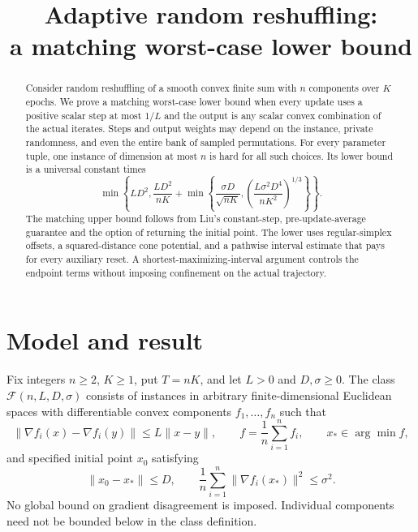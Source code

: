 \documentclass[11pt]{article}
\title{Adaptive random reshuffling:\\a matching worst-case lower bound}
\author{}
\date{}
\theoremstyle{remark}
\newcommand{\norm}[1]{\lVert #1\rVert}
\newcommand{\Class}{\mathcal F}
\begin{document}
\maketitle

\begin{abstract}
Consider random reshuffling of a smooth convex finite sum with $n$
components over $K$ epochs. We prove a matching worst-case lower bound
when every update uses a positive scalar step at most $1/L$ and the
output is any scalar convex combination of the actual iterates. Steps
and output weights may depend on the instance, private randomness, and
even the entire bank of sampled permutations. For every parameter tuple,
one instance of dimension at most $n$ is hard for all such choices.
Its lower bound is a universal constant times
\[
 \min\!\left\{LD^2,\frac{LD^2}{nK}
 +\min\!\left\{\frac{\sigma D}{\sqrt{nK}},
       \left(\frac{L\sigma^2D^4}{nK^2}\right)^{1/3}\right\}\right\}.
\]
The matching upper bound follows from Liu's constant-step,
pre-update-average guarantee and the option of returning the initial
point. The lower uses regular-simplex offsets, a squared-distance cone
potential, and a pathwise interval estimate that pays for every
auxiliary reset. A shortest-maximizing-interval argument controls the
endpoint terms without imposing confinement on the actual trajectory.
\end{abstract}

\section{Model and result}

Fix integers $n\ge2$, $K\ge1$, put $T=nK$, and let $L>0$ and
$D,\sigma\ge0$. The class $\Class(n,L,D,\sigma)$ consists of instances
in arbitrary finite-dimensional Euclidean spaces with differentiable
convex components $f_1,\ldots,f_n$ such that
\begin{equation}\label{eq:class}
 \norm{\nabla f_i(x)-\nabla f_i(y)}\le L\norm{x-y},\qquad
 f=\frac1n\sum_{i=1}^n f_i,\qquad
 x_*\in\arg\min f,
\end{equation}
and specified initial point $x_0$ satisfying
\begin{equation}\label{eq:parameters}
 \norm{x_0-x_*}\le D,\qquad
 \frac1n\sum_{i=1}^n\norm{\nabla f_i(x_*)}^2\le\sigma^2.
\end{equation}
No global bound on gradient disagreement is imposed. Individual
components need not be bounded below in the class definition.
\end{document}
